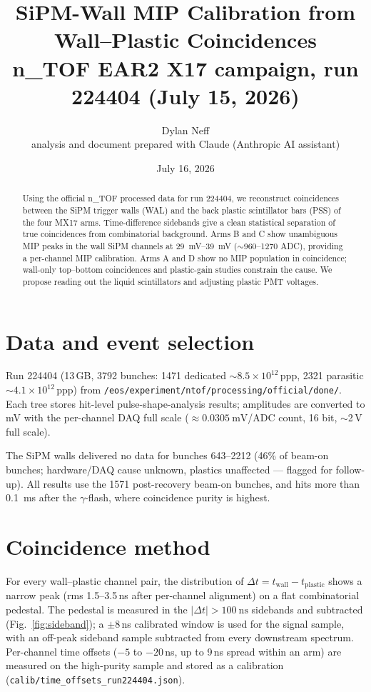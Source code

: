 \documentclass[11pt]{article}
\title{SiPM-Wall MIP Calibration from Wall--Plastic Coincidences\\
       \large n\_TOF EAR2 X17 campaign, run 224404 (July 15, 2026)}
\author{Dylan Neff \\[0.5ex] {\small analysis and document prepared with Claude (Anthropic AI assistant)}}
\date{July 16, 2026}
\begin{document}
\maketitle

\begin{abstract}
Using the official n\_TOF processed data for run 224404, we reconstruct
coincidences between the SiPM trigger walls (WAL) and the back plastic
scintillator bars (PSS) of the four MX17 arms. Time-difference sidebands give a
clean statistical separation of true coincidences from combinatorial
background. Arms B and C show unambiguous MIP peaks in the wall SiPM channels
at \SIrange{29}{39}{\milli\volt} ($\sim$960--1270 ADC), providing a per-channel
MIP calibration. Arms A and D show no MIP population in coincidence; wall-only
top--bottom coincidences and plastic-gain studies constrain the cause. We
propose reading out the liquid scintillators and adjusting plastic PMT
voltages.
\end{abstract}

\section{Data and event selection}
Run 224404 (13\,GB, 3792 bunches: 1471 dedicated $\sim8.5\times10^{12}$\,ppp,
2321 parasitic $\sim4.1\times10^{12}$\,ppp) from
\texttt{/eos/experiment/ntof/processing/official/done/}. Each tree stores
hit-level pulse-shape-analysis results; amplitudes are converted to mV with the
per-channel DAQ full scale ($\approx\SI{0.0305}{\milli\volt}$/ADC count, 16
bit, $\sim$2\,V full scale).

The SiPM walls delivered no data for bunches 643--2212 (46\% of beam-on
bunches; hardware/DAQ cause unknown, plastics unaffected --- flagged for
follow-up). All results use the 1571 post-recovery beam-on bunches, and hits
more than \SI{0.1}{\milli\second} after the $\gamma$-flash, where coincidence
purity is highest.

\section{Coincidence method}
For every wall--plastic channel pair, the distribution of
$\Delta t = t_\mathrm{wall}-t_\mathrm{plastic}$ shows a narrow peak
(rms 1.5--3.5\,ns after per-channel alignment) on a flat combinatorial
pedestal. The pedestal is measured in the $|\Delta t|>\SI{100}{\nano\second}$
sidebands and subtracted (Fig.~\ref{fig:sideband}); a $\pm$8\,ns calibrated
window is used for the signal sample, with an off-peak sideband sample
subtracted from every downstream spectrum. Per-channel time offsets
($-5$ to $-20$\,ns, up to 9\,ns spread within an arm) are measured on the
high-purity sample and stored as a calibration
(\texttt{calib/time\_offsets\_run224404.json}).
\end{document}
